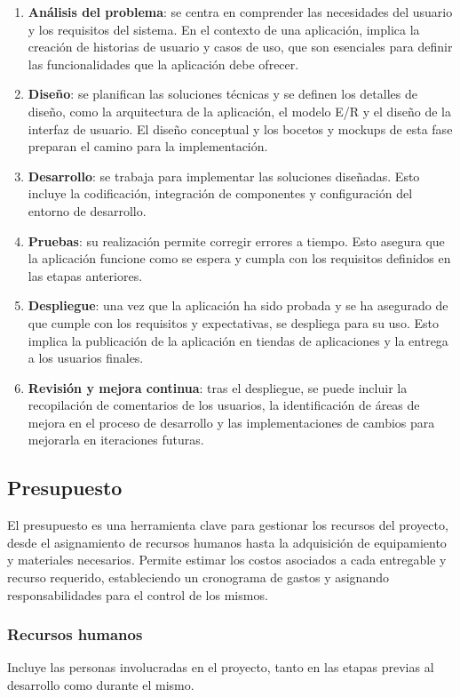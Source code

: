 \begin{enumerate}
    \item \textbf{Análisis del problema}: se centra en comprender las necesidades del usuario y los requisitos del sistema. En el contexto de una aplicación, implica la creación de historias de usuario y casos de uso, que son esenciales para definir las funcionalidades que la aplicación debe ofrecer.
    \item \textbf{Diseño}: se planifican las soluciones técnicas y se definen los detalles de diseño, como la arquitectura de la aplicación, el modelo E/R y el diseño de la interfaz de usuario. El diseño conceptual y los bocetos y mockups de esta fase preparan el camino para la implementación.
    \item \textbf{Desarrollo}: se trabaja para implementar las soluciones diseñadas. Esto incluye la codificación, integración de componentes y configuración del entorno de desarrollo.
    \item \textbf{Pruebas}: su realización permite corregir errores a tiempo. Esto asegura que la aplicación funcione como se espera y cumpla con los requisitos definidos en las etapas anteriores.
    \item \textbf{Despliegue}: una vez que la aplicación ha sido probada y se ha asegurado de que cumple con los requisitos y expectativas, se despliega para su uso. Esto implica la publicación de la aplicación en tiendas de aplicaciones y la entrega a los usuarios finales.
    \item \textbf{Revisión y mejora continua}: tras el despliegue, se puede incluir la recopilación de comentarios de los usuarios, la identificación de áreas de mejora en el proceso de desarrollo y las implementaciones de cambios para mejorarla en iteraciones futuras.
\end{enumerate}


\subsection{Presupuesto}

El presupuesto es una herramienta clave para gestionar los recursos del proyecto, desde el asignamiento de recursos humanos hasta la adquisición de equipamiento y materiales necesarios. Permite estimar los costos asociados a cada entregable y recurso requerido, estableciendo un cronograma de gastos y asignando responsabilidades para el control de los mismos.

\subsubsection{Recursos humanos}
Incluye las personas involucradas en el proyecto, tanto en las etapas previas al desarrollo como durante el mismo.


